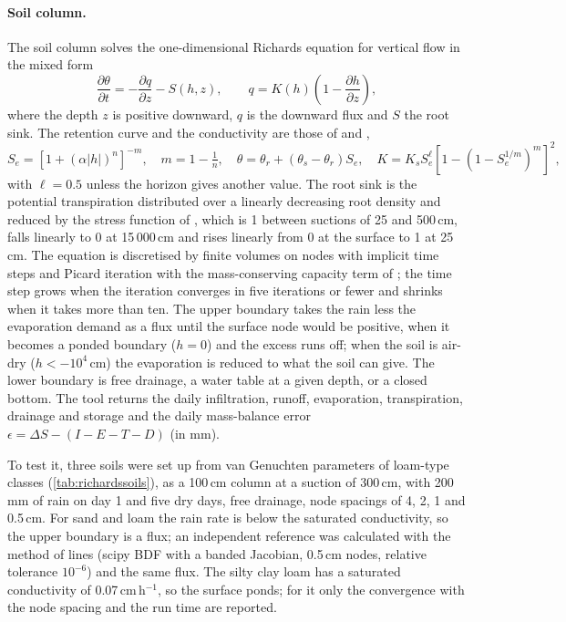 \paragraph{Soil column.}
The soil column solves the one-dimensional Richards equation for vertical flow in the mixed form
\begin{equation}\label{eq:richards}
\frac{\partial\theta}{\partial t}=-\frac{\partial q}{\partial z}-S(h,z),\qquad q=K(h)\left(1-\frac{\partial h}{\partial z}\right),
\end{equation}
where the depth $z$ is positive downward, $q$ is the downward flux and $S$ the root sink. The retention curve and the conductivity are those of \citet{vanGenuchten1980} and \citet{Mualem1976},
\begin{equation}\label{eq:vgm}
S_e=\left[1+(\alpha|h|)^n\right]^{-m},\quad m=1-\tfrac1n,\quad \theta=\theta_r+(\theta_s-\theta_r)S_e,\quad K=K_sS_e^{\ell}\left[1-\left(1-S_e^{1/m}\right)^m\right]^2,
\end{equation}
with $\ell=0.5$ unless the horizon gives another value. The root sink is the potential transpiration distributed over a linearly decreasing root density and reduced by the stress function of \citet{Feddes1978}, which is 1 between suctions of 25 and 500\,cm, falls linearly to 0 at 15\,000\,cm and rises linearly from 0 at the surface to 1 at 25\,cm. The equation is discretised by finite volumes on nodes with implicit time steps and Picard iteration with the mass-conserving capacity term of \citet{Celia1990}; the time step grows when the iteration converges in five iterations or fewer and shrinks when it takes more than ten. The upper boundary takes the rain less the evaporation demand as a flux until the surface node would be positive, when it becomes a ponded boundary ($h=0$) and the excess runs off; when the soil is air-dry ($h<-10^4$\,cm) the evaporation is reduced to what the soil can give. The lower boundary is free drainage, a water table at a given depth, or a closed bottom. The tool returns the daily infiltration, runoff, evaporation, transpiration, drainage and storage and the daily mass-balance error $\epsilon=\Delta S-(I-E-T-D)$ (in mm).

To test it, three soils were set up from van Genuchten parameters of loam-type classes (\cref{tab:richardssoils}), as a 100\,cm column at a suction of 300\,cm, with 200\,mm of rain on day 1 and five dry days, free drainage, node spacings of 4, 2, 1 and 0.5\,cm. For sand and loam the rain rate is below the saturated conductivity, so the upper boundary is a flux; an independent reference was calculated with the method of lines (scipy BDF with a banded Jacobian, 0.5\,cm nodes, relative tolerance $10^{-6}$) and the same flux. The silty clay loam has a saturated conductivity of 0.07\,cm\,h$^{-1}$, so the surface ponds; for it only the convergence with the node spacing and the run time are reported.

